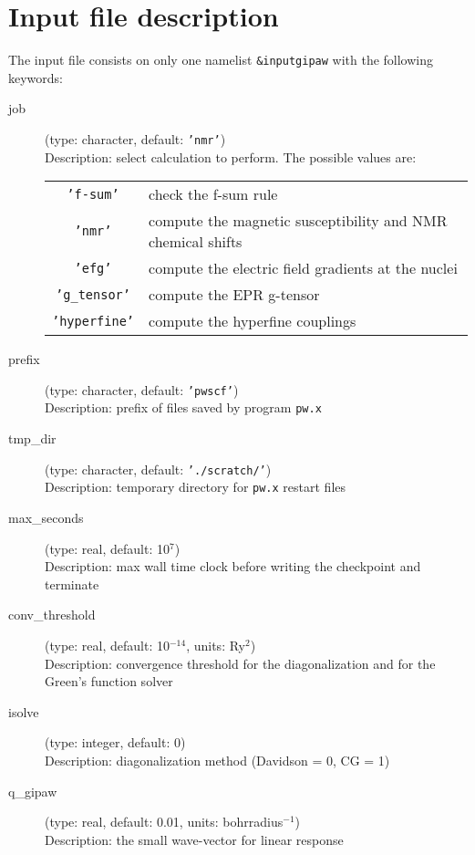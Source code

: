 \documentclass[a4paper,11pt,twoside]{article}
\begin{document}
\section{Input file description}
The input file consists on only one namelist \texttt{\&inputgipaw} with the
following keywords:
\begin{description}
\item[job] (type: character, default: \texttt{'nmr'})\\
Description: select calculation to perform. The possible values are:\\
\begin{tabular}{cl}
  \texttt{'f-sum'} & check the f-sum rule\\
  \texttt{'nmr'}   & compute the magnetic susceptibility and NMR chemical shifts\\
  \texttt{'efg'}   & compute the electric field gradients at the nuclei\\
  \texttt{'g\_tensor'}& compute the EPR g-tensor\\
  \texttt{'hyperfine'}& compute the hyperfine couplings
\end{tabular}

\item[prefix] (type: character, default: \texttt{'pwscf'})\\
Description: prefix of files saved by program \texttt{pw.x}

\item[tmp\_dir] (type: character, default: \texttt{'./scratch/'})\\
Description: temporary directory for \texttt{pw.x} restart files

\item[max\_seconds] (type: real, default: 10$^7$)\\
Description: max wall time clock before writing the checkpoint and terminate

\item[conv\_threshold] (type: real, default: 10$^{-14}$, units: Ry$^2$)\\
Description: convergence threshold for the diagonalization and for the Green's function solver

\item[isolve] (type: integer, default: 0)\\
Description: diagonalization method (Davidson = 0, CG = 1)

\item[q\_gipaw] (type: real, default: 0.01, units: bohrradius$^{-1}$)\\
Description: the small wave-vector for linear response


\end{description}
\end{document}
